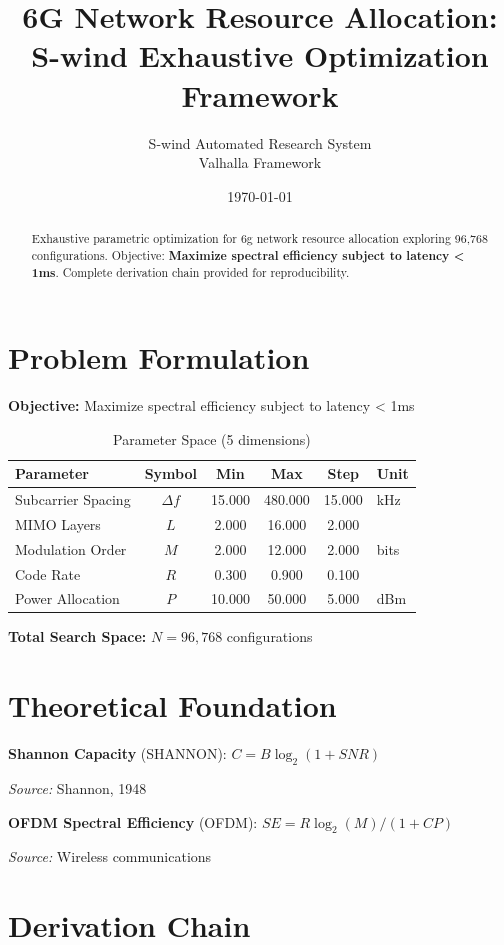 \documentclass[11pt,twocolumn]{article}
\title{6G Network Resource Allocation: \\S-wind Exhaustive Optimization Framework}
\author{S-wind Automated Research System\\Valhalla Framework}
\date{\today}
\begin{document}
\maketitle

\begin{abstract}
Exhaustive parametric optimization for 6g network resource allocation exploring 96,768 configurations.
Objective: \textbf{Maximize spectral efficiency subject to latency < 1ms}.
Complete derivation chain provided for reproducibility.
\end{abstract}

\section{Problem Formulation}
\textbf{Objective:} Maximize spectral efficiency subject to latency < 1ms

\begin{table}[h]
\centering
\caption{Parameter Space (5 dimensions)}
\begin{tabular}{@{}lccccl@{}}
\toprule
Parameter & Symbol & Min & Max & Step & Unit \\
\midrule
Subcarrier Spacing & $\Delta f$ & 15.000 & 480.000 & 15.000 & kHz \\
MIMO Layers & $L$ & 2.000 & 16.000 & 2.000 &  \\
Modulation Order & $M$ & 2.000 & 12.000 & 2.000 & bits \\
Code Rate & $R$ & 0.300 & 0.900 & 0.100 &  \\
Power Allocation & $P$ & 10.000 & 50.000 & 5.000 & dBm \\
\bottomrule
\end{tabular}
\end{table}

\textbf{Total Search Space:} $N = 96,768$ configurations

\section{Theoretical Foundation}
\textbf{Shannon Capacity} (SHANNON): $C = B\log_2(1+SNR)$

\textit{Source:} Shannon, 1948

\textbf{OFDM Spectral Efficiency} (OFDM): $SE = R \log_2(M) / (1+CP)$

\textit{Source:} Wireless communications


\section{Derivation Chain}
\end{document}
